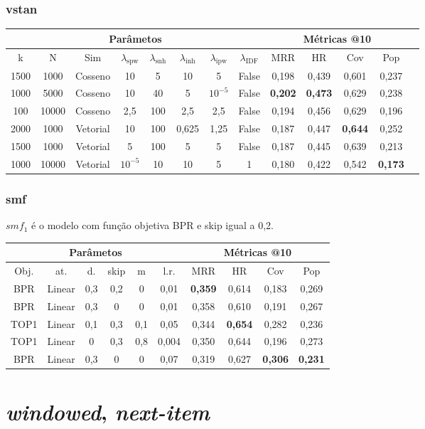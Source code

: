 \subsubsection{vstan}
\begin{table}[htbp]
    \centering
    \begin{tabular}{|c|c|c|c|c|c|c|c|c|c|c|c|c|}
      \hline
      \multicolumn{8}{|c|}{Parâmetos} & \multicolumn{4}{c|}{Métricas @10} \\
      \hline
      k & N & Sim & $\lambda_{\text{spw}}$ & $\lambda_{\text{snh}}$ & $\lambda_{\text{inh}}$ & $\lambda_{\text{ipw}}$ & $\lambda_{\text{IDF}}$ & MRR & HR & Cov & Pop \\
      \hline
      1500 & 1000 & Cosseno & 10 & 5 & 10 & 5 & False & 0,198 & 0,439 & 0,601 & 0,237 \\
      \hline
      1000 & 5000 & Cosseno & 10 & 40 & 5 & $10^{-5}$ & False & \textbf{0,202} & \textbf{0,473} & 0,629 & 0,238 \\
      \hline
      100 & 10000 & Cosseno & 2,5 & 100 & 2,5 & 2,5 & False & 0,194 & 0,456 & 0,629 & 0,196 \\
      \hline
      2000 & 1000 & Vetorial & 10 & 100 & 0,625 & 1,25 & False & 0,187 & 0,447 & \textbf{0,644} & 0,252 \\
      \hline
      1500 & 1000 & Vetorial & 5 & 100 & 5 & 5 & False & 0,187 & 0,445 & 0,639 & 0,213 \\
      \hline
      1000 & 10000 & Vetorial & $10^{-5}$ & 10 & 10 & 5 & 1 & 0,180 & 0,422 & 0,542 & \textbf{0,173} \\
      \hline
    \end{tabular}
  \end{table}

\subsubsection{smf}
$smf_{1}$ é o modelo com função objetiva BPR e skip igual a 0,2.
\begin{table}
  \centering
  \begin{tabular}{|c|c|c|c|c|c|c|c|c|c|}
    \hline
      \multicolumn{6}{|c|}{Parâmetos} & \multicolumn{4}{c|}{Métricas @10} \\
      \hline
      Obj. & at. & d. & skip & m & l.r. & MRR & HR & Cov & Pop \\
      \hline
      BPR & Linear & 0,3 & 0,2 & 0 & 0,01 & \textbf{0,359} & 0,614 & 0,183 & 0,269 \\
      \hline
      BPR & Linear & 0,3 & 0 & 0 & 0,01 & 0,358 & 0,610 & 0,191 & 0,267 \\
      \hline
      TOP1 & Linear & 0,1 & 0,3 & 0,1 & 0,05 & 0,344 & \textbf{0,654} & 0,282 & 0,236 \\
      \hline
      TOP1 & Linear & 0 & 0,3 & 0,8 & 0,004 & 0,350 & 0,644 & 0,196 & 0,273 \\
      \hline
      BPR & Linear & 0,3 & 0 & 0 & 0,07 & 0,319 & 0,627 & \textbf{0,306} & \textbf{0,231} \\
      \hline
      \end{tabular}
\end{table}


\section{\textit{windowed}, \textit{next-item}}

